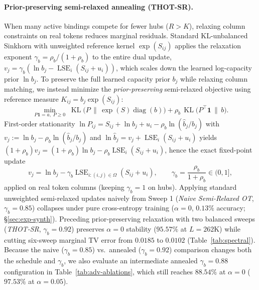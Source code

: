 \documentclass[11pt]{article}
\newcommand{\one}{\mathbf{1}}
\begin{document}
\paragraph{Prior-preserving semi-relaxed annealing (THOT-SR).}
When many active bindings compete for fewer hubs ($R > K$), relaxing column constraints on real tokens reduces marginal residuals. Standard KL-unbalanced Sinkhorn with unweighted reference kernel $\exp(S_{ij})$ \citep{chizat2018scaling} applies the relaxation exponent $\gamma_b = \rho_b/(1+\rho_b)$ to the entire dual update, $v_j = \gamma_b(\ln b_j - \operatorname{LSE}_i(S_{ij}+u_i))$, which scales down the learned log-capacity prior $\ln b_j$. To preserve the full learned capacity prior $b_j$ while relaxing column matching, we instead minimize the \emph{prior-preserving} semi-relaxed objective using reference measure $K_{ij} = b_j \exp(S_{ij})$:
\begin{equation}
  \min_{P\one = a,\; P \ge 0}\; \operatorname{KL}\!\big(P \,\|\, \exp(S)\operatorname{diag}(b)\big) + \rho_b\,\operatorname{KL}\!\big(P^\top \one \,\|\, b\big).
  \label{eq:prior-semirelax-obj}
\end{equation}
First-order stationarity $\ln P_{ij} = S_{ij} + \ln b_j + u_i - \rho_b \ln(\hat{b}_j / b_j)$ with $v_j := \ln b_j - \rho_b \ln(\hat{b}_j / b_j)$ and $\ln \hat{b}_j = v_j + \operatorname{LSE}_i(S_{ij} + u_i)$ yields $(1 + \rho_b) v_j = (1 + \rho_b)\ln b_j - \rho_b \operatorname{LSE}_i(S_{ij} + u_i)$, hence the exact fixed-point update
\begin{equation}
  v_j = \ln b_j - \gamma_b \operatorname{LSE}_{i:(i,j)\in\Omega}(S_{ij} + u_i), \qquad \gamma_b = \frac{\rho_b}{1 + \rho_b} \in (0, 1],
  \label{eq:prior-semirelax-upd}
\end{equation}
applied on real token columns (keeping $\gamma_b = 1$ on hubs). Applying standard unweighted semi-relaxed updates naively from Sweep 1 (\emph{Naive Semi-Relaxed OT}, $\gamma_b=0.85$) collapses under pure cross-entropy training ($\alpha=0$, $0.13\%$ accuracy; \S\ref{sec:exp-synth}). Preceding prior-preserving relaxation with two balanced sweeps (\emph{THOT-SR}, $\gamma_b=0.92$) preserves $\alpha=0$ stability ($95.57\%$ at $L=262\text{K}$) while cutting six-sweep marginal TV error from $0.0185$ to $0.0102$ (Table~\ref{tab:spectral}). Because the naive ($\gamma_b=0.85$) vs.\ annealed ($\gamma_b=0.92$) comparison changes both the schedule and $\gamma_b$, we also evaluate an intermediate annealed $\gamma_b=0.88$ configuration in Table~\ref{tab:adv-ablations}, which still reaches $88.54\%$ at $\alpha=0$ ($97.53\%$ at $\alpha=0.05$).
\end{document}
